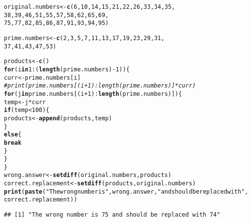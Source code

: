 \documentclass{article}\usepackage[]{graphicx}\usepackage[]{xcolor}
\makeatletter
\newcommand{\hlnum}[1]{\textcolor[rgb]{0.686,0.059,0.569}{#1}}%
\newcommand{\hlsng}[1]{\textcolor[rgb]{0.192,0.494,0.8}{#1}}%
\newcommand{\hlcom}[1]{\textcolor[rgb]{0.678,0.584,0.686}{\textit{#1}}}%
\newcommand{\hlopt}[1]{\textcolor[rgb]{0,0,0}{#1}}%
\newcommand{\hldef}[1]{\textcolor[rgb]{0.345,0.345,0.345}{#1}}%
\newcommand{\hlkwa}[1]{\textcolor[rgb]{0.161,0.373,0.58}{\textbf{#1}}}%
\newcommand{\hlkwb}[1]{\textcolor[rgb]{0.69,0.353,0.396}{#1}}%
\newcommand{\hlkwd}[1]{\textcolor[rgb]{0.737,0.353,0.396}{\textbf{#1}}}%
\newenvironment{kframe}{%
 \def\at@end@of@kframe{}%
 \ifinner\ifhmode%
  \def\at@end@of@kframe{\end{minipage}}%
  \begin{minipage}{\columnwidth}%
 \fi\fi%
 \def\FrameCommand##1{\hskip\@totalleftmargin \hskip-\fboxsep
 \colorbox{shadecolor}{##1}\hskip-\fboxsep
     \hskip-\linewidth \hskip-\@totalleftmargin \hskip\columnwidth}%
 \MakeFramed {\advance\hsize-\width
   \@totalleftmargin\z@ \linewidth\hsize
   \@setminipage}}%
 {\par\unskip\endMakeFramed%
 \at@end@of@kframe}
\newenvironment{knitrout}{}{} %
\makeatother
\begin{document}
\begin{enumerate}
\begin{knitrout}\scriptsize
{}\color{fgcolor}\begin{kframe}
\begin{alltt}
\hldef{original.numbers} \hlkwb{<-} \hlkwd{c}\hldef{(}\hlnum{6}\hldef{,}\hlnum{10}\hldef{,}\hlnum{14}\hldef{,}\hlnum{15}\hldef{,}\hlnum{21}\hldef{,}\hlnum{22}\hldef{,}\hlnum{26}\hldef{,}\hlnum{33}\hldef{,}\hlnum{34}\hldef{,}\hlnum{35}\hldef{,}
                  \hlnum{38}\hldef{,}\hlnum{39}\hldef{,}\hlnum{46}\hldef{,}\hlnum{51}\hldef{,}\hlnum{55}\hldef{,}\hlnum{57}\hldef{,}\hlnum{58}\hldef{,}\hlnum{62}\hldef{,}\hlnum{65}\hldef{,}\hlnum{69}\hldef{,}
                  \hlnum{75}\hldef{,}\hlnum{77}\hldef{,}\hlnum{82}\hldef{,}\hlnum{85}\hldef{,}\hlnum{86}\hldef{,}\hlnum{87}\hldef{,}\hlnum{91}\hldef{,}\hlnum{93}\hldef{,}\hlnum{94}\hldef{,}\hlnum{95}\hldef{)}

\hldef{prime.numbers} \hlkwb{<-} \hlkwd{c}\hldef{(}\hlnum{2}\hldef{,}\hlnum{3}\hldef{,}\hlnum{5}\hldef{,}\hlnum{7}\hldef{,}\hlnum{11}\hldef{,}\hlnum{13}\hldef{,}\hlnum{17}\hldef{,}\hlnum{19}\hldef{,}\hlnum{23}\hldef{,}\hlnum{29}\hldef{,}\hlnum{31}\hldef{,}
                   \hlnum{37}\hldef{,}\hlnum{41}\hldef{,}\hlnum{43}\hldef{,}\hlnum{47}\hldef{,}\hlnum{53}\hldef{)}

\hldef{products} \hlkwb{<-} \hlkwd{c}\hldef{()}
\hlkwa{for}\hldef{(i} \hlkwa{in} \hlnum{1}\hlopt{:}\hldef{(}\hlkwd{length}\hldef{(prime.numbers)}\hlopt{-}\hlnum{1}\hldef{))\{}
  \hldef{curr} \hlkwb{<-} \hldef{prime.numbers[i]}
  \hlcom{# print(prime.numbers[(i+1):length(prime.numbers)] *curr)}
  \hlkwa{for}\hldef{(j} \hlkwa{in} \hldef{prime.numbers[(i}\hlopt{+}\hlnum{1}\hldef{)}\hlopt{:}\hlkwd{length}\hldef{(prime.numbers)])\{}
    \hldef{temp} \hlkwb{<-} \hldef{j}\hlopt{*}\hldef{curr}
    \hlkwa{if}\hldef{(temp} \hlopt{<} \hlnum{100}\hldef{)\{}
      \hldef{products} \hlkwb{<-} \hlkwd{append}\hldef{(products,temp)}
    \hldef{\}}
    \hlkwa{else}\hldef{\{}
      \hlkwa{break}
    \hldef{\}}
  \hldef{\}}
\hldef{\}}
\hldef{wrong.answer} \hlkwb{<-} \hlkwd{setdiff}\hldef{(original.numbers,products)}
\hldef{correct.replacement} \hlkwb{<-} \hlkwd{setdiff}\hldef{(products,original.numbers)}
\hlkwd{print}\hldef{(}\hlkwd{paste}\hldef{(}\hlsng{"The wrong number is"}\hldef{, wrong.answer,} \hlsng{"and should be replaced with"}\hldef{,}
            \hldef{correct.replacement))}
\end{alltt}
\begin{verbatim}
## [1] "The wrong number is 75 and should be replaced with 74"
\end{verbatim}
\end{kframe}
\end{knitrout}
\end{enumerate}


\end{document}
